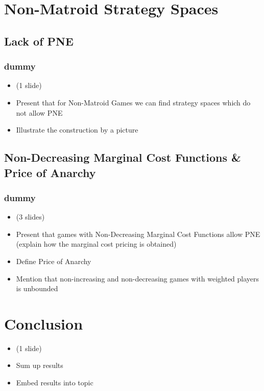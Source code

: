 \documentclass{beamer}
\newcommand{\ft}{\frametitle{dummy}}
\begin{document}
\section{Non-Matroid Strategy Spaces}
\subsection{Lack of PNE}
\begin{frame}
  \ft
  \begin{itemize}
    \item (1 slide)
    \item Present that for Non-Matroid Games we can find strategy spaces
      which do not allow PNE
    \item Illustrate the construction by a picture
  \end{itemize}
\end{frame}

\subsection{Non-Decreasing Marginal Cost Functions \& Price of Anarchy}
\begin{frame}
  \ft
  \begin{itemize}
    \item (3 slides)
    \item Present that games with Non-Decreasing Marginal Cost Functions allow
      PNE (explain how the marginal cost pricing is obtained)
    \item Define Price of Anarchy
    \item Mention that non-increasing and non-decreasing games with weighted
      players is unbounded
  \end{itemize}
\end{frame}

\section{Conclusion}
\begin{frame}
  \begin{itemize}
    \item (1 slide)
    \item Sum up results
    \item Embed results into topic
  \end{itemize}
\end{frame}
\end{document}
